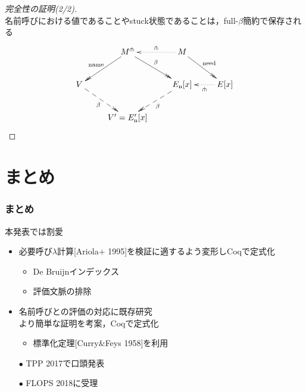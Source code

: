 \documentclass[dvipdfmx,cjk,xcolor=dvipsnames,envcountsect,notheorems,12pt]{beamer}
\theoremstyle{definition}
\newcommand{\EXPANDLET}[1]{#1^\pitchfork}
\begin{document}
\begin{frame}
	\large
	\begin{proof}[完全性の証明(2/2)]
		 \\
		\medskip
		名前呼びにおける値であることやstuck状態であることは，full-$\beta$簡約で保存される
		\[\xymatrix{
			& \EXPANDLET{M} \ar@{->>}[ld]_-{\mathrm{name}} \ar@{->>}[rd]^-\beta & M \ar@{.>}[l]_-{\pitchfork} \ar@{->>}[rd]^-{\mathrm{need}}\\
			V \ar@{-->>}[rd]_-\beta & & E_\mathrm{n}[x] \ar@{-->>}[ld]^-\beta & E[x] \ar@{.>}[l]^-{\pitchfork} \\
			& V'=E_\mathrm{n}'[x] \\
		}\]
	\end{proof}
\end{frame}

\section{まとめ}

\begin{frame}
	\frametitle{まとめ}
	\begin{block}{本発表では割愛}
		\begin{itemize}
			\item 必要呼び$\lambda$計算[Ariola+ 1995]を検証に適するよう変形しCoqで定式化
				\begin{itemize}
					\item De Bruijnインデックス
					\item 評価文脈の排除
				\end{itemize}
		\end{itemize}
	\end{block}
	\begin{itemize}
		\item 名前呼びとの評価の対応に\alert{既存研究\\より簡単な証明を考案}，Coqで定式化
			\begin{itemize}
				\item 標準化定理[Curry\&Feys 1958]を利用
			\end{itemize}
		\item[$\bullet$] TPP 2017で口頭発表
		\item[$\bullet$] FLOPS 2018に受理
	\end{itemize}
\end{frame}
\end{document}
